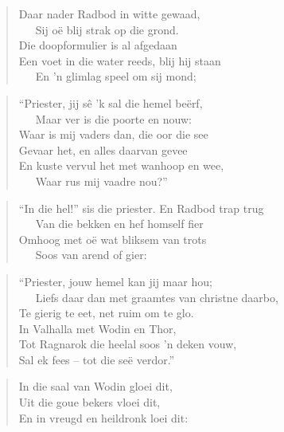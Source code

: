 \begin{verse}
Daar nader Radbod in witte gewaad, \\ 
\ \ \ Sij o\"e blij strak op die grond. \\ 
Die doopformulier is al afgedaan \\ 
Een voet in die water reeds, blij hij staan \\ 
\ \ \ En ’n glimlag speel om sij mond; \\ 
\end{verse}

\begin{verse}
``Priester, jij sê ’k sal die hemel be\"erf, \\ 
\ \ \ Maar ver is die poorte en nouw: \\ 
Waar is mij vaders dan, die oor die see \\ 
Gevaar het, en alles daarvan gevee \\ 
En kuste vervul het met wanhoop en wee, \\ 
\ \ \ Waar rus mij vaadre nou?'' \\ 
\end{verse}

\begin{verse}
``In die hel!'' sis die priester. En Radbod trap trug \\ 
\ \ \ Van die bekken en hef homself fier \\ 
Omhoog met o\"e wat bliksem van trots \\ 
\ \ \ Soos van arend of gier: \\ 
\end{verse}

\begin{verse}
``Priester, jouw hemel kan jij maar hou; \\ 
\ \ \ Liefs daar dan met graamtes van christne daarbo, \\ 
Te gierig te eet, net ruim om te glo. \\ 
In Valhalla met Wodin en Thor, \\ 
Tot Ragnarok die heelal soos ’n deken vouw, \\ 
Sal ek fees -- tot die se\"e verdor.'' \\ 
\end{verse}

\begin{verse}
In die saal van Wodin gloei dit, \\ 
Uit die goue bekers vloei dit, \\ 
En in vreugd en heildronk loei dit: \\ 
\end{verse}


